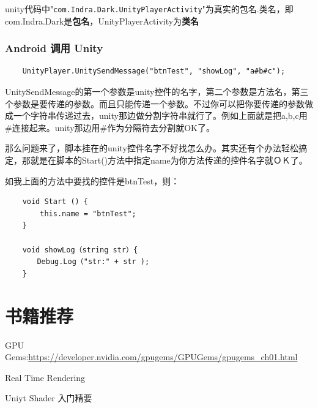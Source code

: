 \documentclass[UTF8,a4paper,12pt]{ctexbook}
\begin{document}
			unity代码中"\verb|com.Indra.Dark.UnityPlayerActivity|"为真实的包名.类名，即com.Indra.Dark是\textbf{包名}，UnityPlayerActivity为\textbf{类名}
				
		\subsection{Android 调用 Unity}
			\begin{lstlisting}
	UnityPlayer.UnitySendMessage("btnTest", "showLog", "a#b#c");
			\end{lstlisting}
			
			UnitySendMessage的第一个参数是unity控件的名字，第二个参数是方法名，第三个参数是要传递的参数。而且只能传递一个参数。不过你可以把你要传递的参数做成一个字符串传递过去，unity那边做分割字符串就行了。例如上面就是把a,b,c用\#连接起来。unity那边用\#作为分隔符去分割就OK了。
		
			那么问题来了，脚本挂在的unity控件名字不好找怎么办。其实还有个办法轻松搞定，那就是在脚本的Start()方法中指定name为你方法传递的控件名字就ＯＫ了。
			
			如我上面的方法中要找的控件是btnTest，则：
			\begin{lstlisting}
	void Start () {
	    this.name = "btnTest";
	}
	
	void showLog（string str）{
	　　Debug.Log（"str:" + str );
	}
			\end{lstlisting}
	
\chapter{书籍推荐}
	
	GPU Gems:\url{https://developer.nvidia.com/gpugems/GPUGems/gpugems_ch01.html}
	
	Real Time Rendering
	
	Uniyt Shader 入门精要
	
\end{document}
